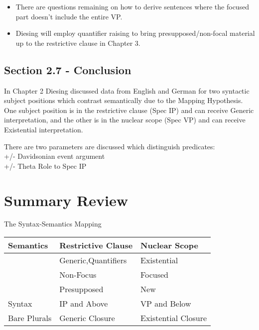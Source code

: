 \documentclass[landscape]{article}
\begin{document}
\begin{itemize}
\item There are questions remaining on how to derive sentences where the focused part doesn't include the entire VP. 

\item Diesing will employ quantifier raising to bring presupposed/non-focal material up to the restrictive clause in Chapter 3. 



\end{itemize}
\subsection*{Section 2.7 - Conclusion}

In Chapter 2 Diesing discussed data from English and German for two syntactic subject positions which contrast semantically due to the Mapping Hypothesis. One subject  position is in the restrictive clause (Spec IP) and can receive Generic interpretation, and the other is in the nuclear scope (Spec VP) and can receive Existential interpretation.

\begin{example}There are two parameters are discussed which distinguish predicates:\\
+/- Davidsonian event argument\\
+/- Theta Role to Spec IP\\
\end{example}


\section*{Summary Review}
\begin{example}The Syntax-Semantics Mapping\\
\begin{tabular}{|l|ll|}\hline
Semantics & Restrictive Clause  & Nuclear Scope\\\hline\hline
& Generic,Quantifiers  & Existential\\
& Non-Focus   & Focused\\
& Presupposed  & New\\\hline
Syntax & IP and Above  & VP and Below\\\hline\hline
Bare Plurals & Generic Closure & Existential Closure\\\hline
\end{tabular}
\end{example}
\end{document}
